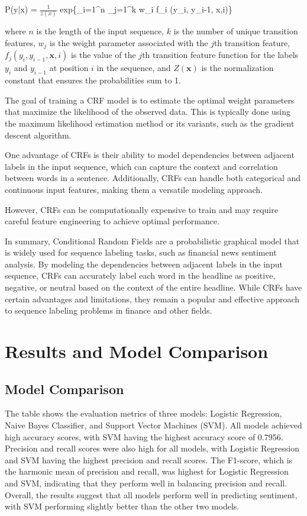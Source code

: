 \documentclass{article}
\begin{document}
P(y|x) = $\frac{1}{z(x)}$     exp\left\{\sum_{i=1}^{n} \sum_{j=1}^{k} w_i f_i (y_i, y_{i-1}, x,i)\right\}


where $n$ is the length of the input sequence, $k$ is the number of unique transition features, $w_j$ is the weight parameter associated with the $j$th transition feature, $f_j(y_i, y_{i-1}, \mathbf{x}, i)$ is the value of the $j$th transition feature function for the labels $y_i$ and $y_{i-1}$ at position $i$ in the sequence, and $Z(\mathbf{x})$ is the normalization constant that ensures the probabilities sum to 1.

The goal of training a CRF model is to estimate the optimal weight parameters that maximize the likelihood of the observed data. This is typically done using the maximum likelihood estimation method or its variants, such as the gradient descent algorithm.

One advantage of CRFs is their ability to model dependencies between adjacent labels in the input sequence, which can capture the context and correlation between words in a sentence. Additionally, CRFs can handle both categorical and continuous input features, making them a versatile modeling approach.

However, CRFs can be computationally expensive to train and may require careful feature engineering to achieve optimal performance.

In summary, Conditional Random Fields are a probabilistic graphical model that is widely used for sequence labeling tasks, such as financial news sentiment analysis. By modeling the dependencies between adjacent labels in the input sequence, CRFs can accurately label each word in the headline as positive, negative, or neutral based on the context of the entire headline. While CRFs have certain advantages and limitations, they remain a popular and effective approach to sequence labeling problems in finance and other fields.

\section{Results and Model Comparison}
\subsection{Model Comparison}



The table shows the evaluation metrics of three models: Logistic Regression, Naive Bayes Classifier, and Support Vector Machines (SVM). All models achieved high accuracy scores, with SVM having the highest accuracy score of 0.7956. Precision and recall scores were also high for all models, with Logistic Regression and SVM having the highest precision and recall scores. The F1-score, which is the harmonic mean of precision and recall, was highest for Logistic Regression and SVM, indicating that they perform well in balancing precision and recall. Overall, the results suggest that all models perform well in predicting sentiment, with SVM performing slightly better than the other two models.
\end{document}
